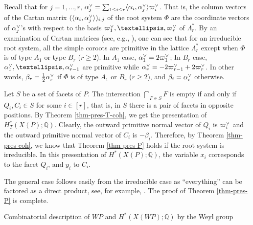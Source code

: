\documentclass{amsart}
\makeatletter
\def\subsection{\@startsection{subsection}{2}
  \z@{.5\linespacing\@plus.7\linespacing}{.5\linespacing}
  {\normalfont\bfseries}}
\theoremstyle{definition}
\theoremstyle{remark}
\numberwithin{equation}{section}
\makeatother
\begin{document}
Recall that for $j=1, \dots, r$,  $\alpha_j\spcheck = \sum_{1 \le i \le r} \langle \alpha_i, \alpha_j\spcheck \rangle \varpi_i\spcheck$.
That is, the column vectors of the Cartan matrix $(\langle \alpha_i, \alpha_j\spcheck \rangle)_{i,j}$ of the  root system $\Phi$ are the coordinate vectors of $\alpha_j\spcheck$'s with respect to the basis $\varpi_1\spcheck, \dots, \varpi_r\spcheck$ of $\Lambda_r^*$.
By an examination of Cartan matrices (see, e.g., \cite[Plate I--IX]{Bourbaki-Lie456}), one can see that for an irreducible root system, all the simple coroots are primitive in the lattice $\Lambda_r^*$ except when $\Phi$ is of type $A_1$ or type $B_r$ ($r \ge 2$). 
In $A_1$ case, $\alpha_1\spcheck = 2 \varpi_1\spcheck$; 
In $B_r$ case, $\alpha_1\spcheck, \dots, \alpha_{r-1}\spcheck$ are primitive while $\alpha_r\spcheck = -2 \varpi_{r-1}\spcheck + 2 \varpi_r\spcheck$.
In other words, $\beta_r = \frac{1}{2} \alpha_r\spcheck$ if $\Phi$ is of type $A_1$ or $B_r$ ($r \ge 2$), and $\beta_i = \alpha_i\spcheck$ otherwise.

Let $S$ be a set of facets of $P$. 
The intersection $\bigcap_{F \in S} F$ is empty if and only if $Q_i, C_i \in S$ for some $i \in [r]$, that is, in $S$ there is a pair of facets in opposite positions. By Theorem \ref{thm-pres-T-coh}, we get the presentation of $H^*_T\left(X(P) ; \mathbb{Q}\right)$. Clearly, the outward primitive normal vector of $Q_i$ is $\varpi_i\spcheck$ and the outward primitive normal vector of $C_i$ is $-\beta_i$.
Therefore, by Theorem \ref{thm-pres-coh}, we know that Theorem \ref{thm-pres-P} holds if the root system is irreducible. In this presentation of $H^*\left(X(P) ; \mathbb{Q}\right)$, the variable $x_i$ corresponds to the facet $Q_i$, and $y_i$ to $C_i$.

The general case follows easily from the irreducible case as ``everything'' can be factored as a direct product, see, for example, \cite[p.\ 19--20]{fulton1993introduction}.
The proof of Theorem \ref{thm-pres-P} is complete.

\subsection{Combinatorial description of \texorpdfstring{$\mathit{WP}$}{WP} and \texorpdfstring{$H^*\left(X(\mathit{WP}) ; \mathbb{Q}\right)$}{H*(X(WP);Q)} by the Weyl group}
\end{document}
